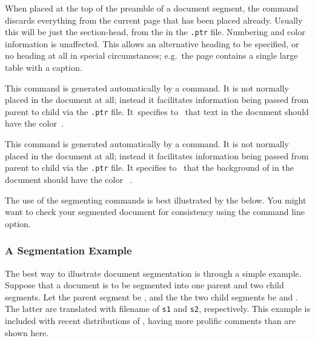 \begin{htmllist}
%
\item [ \Lc{htmlnohead}\label{htmlnohead}] 
%
When placed at the top of the preamble of a document segment, the 
command discards everything from the current page that has been placed already.
Usually this will be just the section-head, from the  
in the \texttt{.ptr} file. Numbering and color information is unaffected.\html{\\}
This allows an alternative heading to be specified, or no heading at all in special
circumstances; e.g.\ the page contains a single large table with a caption.

%
\item [ \Lc{segmentcolor\char123}\Meta{model}%
 \texttt{\char125\char123}\Meta{color}\texttt{\char125}\label{segcolor}] 
%
This command is generated automatically by a  command. 
It is not normally placed in the document at all; instead it facilitates 
information being passed from parent to child 
via the \texttt{.ptr} file.\html{\\}  
It~specifies to \latextohtml\ that text in the document 
should have the color \,.

%
\item [ \Lc{segmentpagecolor\char123}\Meta{model}%
 \texttt{\char125\char123}\Meta{color}\texttt{\char125}\label{segpagecolor}] 
%
This command is generated automatically by a  command. 
It is not normally placed in the document at all; instead it facilitates 
information being passed from parent to child 
via the \texttt{.ptr} file.\html{\\}
It specifies to \latextohtml\ that the background of in the document 
should have the color ~.%
%
\end{htmllist}

The use of the segmenting commands is best illustrated by the
 below.
You might want to check your segmented document for consistency using
the  command line option.


\subsubsection{A Segmentation Example%
  \label{sec:segmentexample}}%
The best way to illustrate document segmentation 
is through a simple example.  
Suppose that a document is to be segmented into one parent 
and two child segments.  
Let the parent segment be , 
and the the two child segments be  and .  
The latter are translated with filename  of 
\texttt{s1} and \texttt{s2}, respectively.  
This example is included with recent distributions of \latextohtml, 
having more prolific comments than are shown here.

